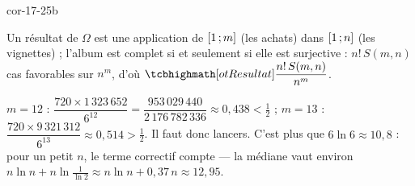 \begin{blocLivre}{cor-17-25b}
\begin{corrigeSuite}
\begin{questions}[start=6]
  \item Un résultat de $\Omega$ est une application de $\mathopen{[}1\,{;}\,m\mathclose{]}$ (les
    achats) dans $\mathopen{[}1\,{;}\,n\mathclose{]}$ (les vignettes) ; l'album est complet si et
    seulement si elle est surjective : $n!\,S(m,n)$ cas favorables sur
    $n^{m}$, d'où $\res{\dfrac{n!\,S(m,n)}{n^{m}}}$.
  \item $m=12$ : $\dfrac{720\times1\,323\,652}{6^{12}}
    =\dfrac{953\,029\,440}{2\,176\,782\,336}\approx0{,}438<\frac12$ ;
    $m=13$ : $\dfrac{720\times9\,321\,312}{6^{13}}\approx0{,}514>\frac12$.
    Il faut donc  lancers. C'est plus que $6\ln6\approx10{,}8$ :
    pour un petit $n$, le terme correctif compte — la médiane vaut environ
    $n\ln n+n\ln\frac{1}{\ln2}\approx n\ln n+0{,}37\,n\approx12{,}95$.
\end{questions}
\end{corrigeSuite}
\end{blocLivre}
